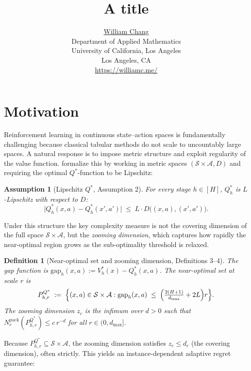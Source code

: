 \documentclass{article}
\title{A title}
\date{} 					%
\author{ \href{https://orcid.org/0000-0003-1700-756X}{William Chang} \\
	Department of Applied Mathematics\\
	University of California, Los Angeles\\
	Los Angeles, CA \\
	\url{https://williamc.me/} \\
	\And
}
\newtheorem{definition}[theorem]{Definition}
\newtheorem{assumption}[theorem]{Assumption}
\begin{document}
\maketitle
\begin{abstract}
    
\end{abstract}

\section{Motivation}

Reinforcement learning in continuous state--action spaces is fundamentally challenging
because classical tabular methods do not scale to uncountably large spaces. A natural
response is to impose metric structure and exploit regularity of the value function.
\citet{cao2021} formalize this by working in metric spaces $(\mathcal{S} \times
\mathcal{A}, D)$ and requiring the optimal $Q^*$-function to be Lipschitz:

\begin{assumption}[Lipschitz $Q^*$, \citet{cao2021} Assumption 2]
\label{asm:lipschitz}
For every stage $h \in [H]$, $Q_h^*$ is $L$-Lipschitz with respect to $D$:
\[
  \bigl|Q_h^*(x,a) - Q_h^*(x',a')\bigr| \;\le\; L \cdot D\bigl((x,a),(x',a')\bigr).
\]
\end{assumption}

Under this structure the key complexity measure is not the covering dimension of the
full space $\mathcal{S} \times \mathcal{A}$, but the \emph{zooming dimension}, which
captures how rapidly the near-optimal region grows as the sub-optimality threshold is
relaxed.

\begin{definition}[Near-optimal set and zooming dimension, \citet{cao2021} Definitions 3--4]
\label{def:zooming}
The gap function is $\mathrm{gap}_h(x,a) := V_h^*(x) - Q_h^*(x,a)$.
The near-optimal set at scale $r$ is
\[
  P^{Q^*}_{h,r} \;:=\;
    \Bigl\{(x,a)\in\mathcal{S}\times\mathcal{A} :
      \mathrm{gap}_h(x,a) \;\le\;
      \Bigl(\tfrac{2(H+1)}{d_{\max}}+2L\Bigr)r\Bigr\}.
\]
The \emph{zooming dimension} $z_c$ is the infimum over $d>0$ such that
$N^{\mathrm{pack}}_r(P^{Q^*}_{h,r}) \le c\,r^{-d}$ for all $r\in(0,d_{\max}]$.
\end{definition}

Because $P^{Q^*}_{h,r}\subseteq \mathcal{S}\times\mathcal{A}$, the zooming dimension
satisfies $z_c \le d_c$ (the covering dimension), often strictly. This yields an
instance-dependent adaptive regret guarantee:
\end{document}
